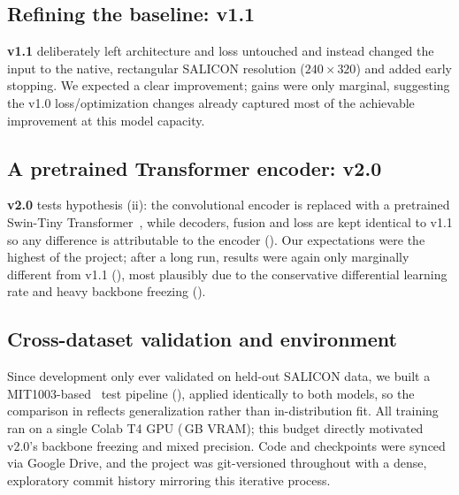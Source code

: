 \subsection{Refining the baseline: v1.1}
\label{subsec:v11-workflow}

\textbf{v1.1} deliberately left architecture and loss untouched and instead changed the input to the native, rectangular SALICON resolution ($240\times320$) and added early stopping. We expected a clear improvement; gains were only marginal, suggesting the v1.0 loss/optimization changes already captured most of the achievable improvement at this model capacity.

\subsection{A pretrained Transformer encoder: v2.0}
\label{subsec:v20-workflow}

\textbf{v2.0} tests hypothesis (ii): the convolutional encoder is replaced with a pretrained Swin-Tiny Transformer~\cite{liu2021swin}, while decoders, fusion and loss are kept identical to v1.1 so any difference is attributable to the encoder (). Our expectations were the highest of the project; after a long run, results were again only marginally different from v1.1 (), most plausibly due to the conservative differential learning rate and heavy backbone freezing ().

\subsection{Cross-dataset validation and environment}
\label{subsec:mit-workflow}
\label{subsec:env}

Since development only ever validated on held-out SALICON data, we built a MIT1003-based~\cite{judd2009learning} test pipeline (), applied identically to both models, so the comparison in  reflects generalization rather than in-distribution fit. All training ran on a single Colab T4 GPU (\,GB VRAM); this budget directly motivated v2.0's backbone freezing and mixed precision. Code and checkpoints were synced via Google Drive, and the project was git-versioned throughout with a dense, exploratory commit history mirroring this iterative process.

